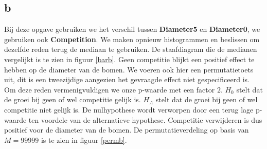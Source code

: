 \documentclass[11pt, a4paper]{article}
\begin{document}
\subsection*{b}
\begin{figure}
\end{figure}
Bij deze opgave gebruiken we het verschil tussen \textbf{Diameter5} en \textbf{Diameter0}, we gebruiken ook \textbf{Competition}. 
We maken opnieuw histogrammen en beslissen om dezelfde reden terug de mediaan te gebruiken. De staafdiagram die de medianen vergelijkt is te zien in figuur \ref{barb}. Geen competitie blijkt een positief effect te hebben op de diameter van de bomen. We voeren ook hier een permutatietoets uit, dit is een tweezijdige aangezien het gevraagde effect niet gespecificeerd is. Om deze reden vermenigvuldigen we onze p-waarde met een factor $2$. $H_0$ stelt dat de groei bij geen of wel competitie gelijk is. $H_A$ stelt dat de groei bij geen of wel competitie niet gelijk is. De nulhypothese wordt verworpen door een terug lage p-waarde ten voordele van de alternatieve hypothese. Competitie verwijderen is dus positief voor de diameter van de bomen. De permutatieverdeling op basis van $M = 99999$ is te zien in figuur \ref{permb}. %
\end{document}
